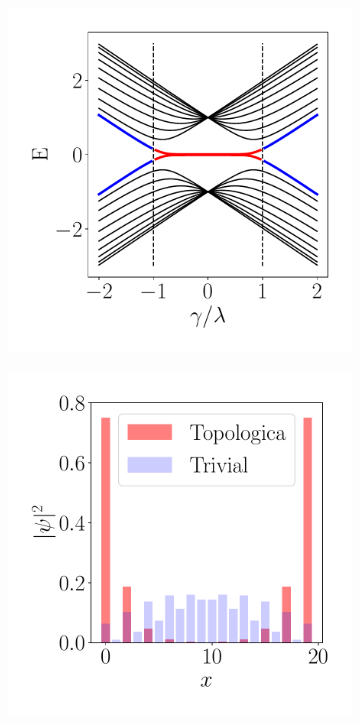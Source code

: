 \begin{figure}[tbh!]
     \centering
    \captionsetup[sub]{font=small}

     \begin{subfigure}[b!]{0.25 \textwidth}
         \caption{}
         \includegraphics[width=\textwidth]{Imagenes/Shh_images/bands_shh.pdf}
     \end{subfigure}\hspace*{-0.9em}
     \begin{subfigure}[b!]{0.25 \textwidth}
         \caption{}
         \includegraphics[width=\textwidth]{Imagenes/Shh_images/proyection_ssh.pdf}

\end{subfigure}
\end{figure}
